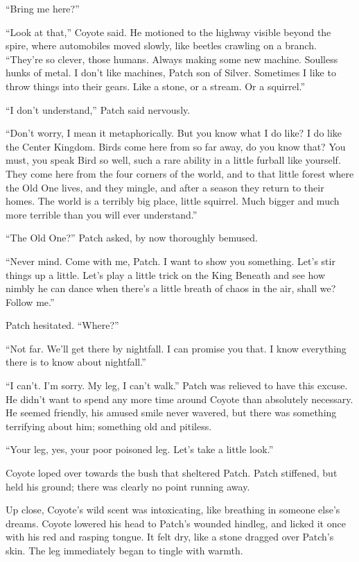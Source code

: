 \documentclass[12pt]{memoir}
\begin{document}
“Bring me here?”

“Look at that,” Coyote said. He motioned to the highway visible beyond
the spire, where automobiles moved slowly, like beetles crawling on a
branch. “They’re so clever, those humans. Always making some new
machine. Soulless hunks of metal. I don’t like machines, Patch son of
Silver. Sometimes I like to throw things into their gears. Like a
stone, or a stream. Or a squirrel.”

“I don’t understand,” Patch said nervously.

“Don’t worry, I mean it metaphorically. But you know what I do like?
I do like the Center Kingdom. Birds come here from so far away, do you
know that? You must, you speak Bird so well, such a rare ability in a
little furball like yourself. They come here from the four corners of
the world, and to that little forest where the Old One lives, and they
mingle, and after a season they return to their homes. The world is a
terribly big place, little squirrel. Much bigger and much more
terrible than you will ever understand.”

“The Old One?” Patch asked, by now thoroughly bemused.

“Never mind. Come with me, Patch. I want to show you something. Let’s
stir things up a little. Let’s play a little trick on the King Beneath
and see how nimbly he can dance when there’s a little breath of chaos
in the air, shall we? Follow me.”

Patch hesitated. “Where?”

“Not far. We’ll get there by nightfall. I can promise you that. I know
everything there is to know about nightfall.”

“I can’t. I’m sorry. My leg, I can’t walk.” Patch was relieved to have
this excuse. He didn’t want to spend any more time around Coyote than
absolutely necessary. He seemed friendly, his amused smile never
wavered, but there was something terrifying about him; something old
and pitiless.

“Your leg, yes, your poor poisoned leg. Let’s take a little look.”

Coyote loped over towards the bush that sheltered Patch. Patch
stiffened, but held his ground; there was clearly no point running
away.

Up close, Coyote’s wild scent was intoxicating, like breathing in
someone else’s dreams. Coyote lowered his head to Patch’s wounded
hindleg, and licked it once with his red and rasping tongue. It felt
dry, like a stone dragged over Patch’s skin. The leg immediately began
to tingle with warmth.
\end{document}

